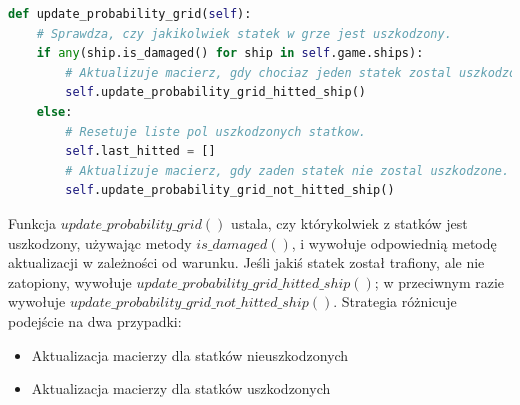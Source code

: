 \documentclass[magisterska]{pracadypl}
\begin{document}
\begin{lstlisting}[language=Python, caption=Kod metody update\_probability\_grid klasy ProbabilityStrategy ] 
def update_probability_grid(self):
    # Sprawdza, czy jakikolwiek statek w grze jest uszkodzony.
    if any(ship.is_damaged() for ship in self.game.ships):
        # Aktualizuje macierz, gdy chociaz jeden statek zostal uszkodzony.
        self.update_probability_grid_hitted_ship()
    else:
        # Resetuje liste pol uszkodzonych statkow.
        self.last_hitted = []
        # Aktualizuje macierz, gdy zaden statek nie zostal uszkodzone.
        self.update_probability_grid_not_hitted_ship()
\end{lstlisting}
Funkcja $update\_probability\_grid()$ ustala, czy którykolwiek z statków jest uszkodzony, używając metody $is\_damaged()$, i wywołuje odpowiednią metodę aktualizacji w zależności od warunku. Jeśli jakiś statek został trafiony, ale nie zatopiony, wywołuje 
\newline
$update\_probability\_grid\_hitted\_ship()$; w przeciwnym razie wywołuje 
\newline
$update\_probability\_grid\_not\_hitted\_ship()$.
Strategia różnicuje podejście na dwa przypadki:
\begin{itemize}
    \item Aktualizacja macierzy dla statków nieuszkodzonych

    \item Aktualizacja macierzy dla statków uszkodzonych
\end{itemize}
\end{document}
